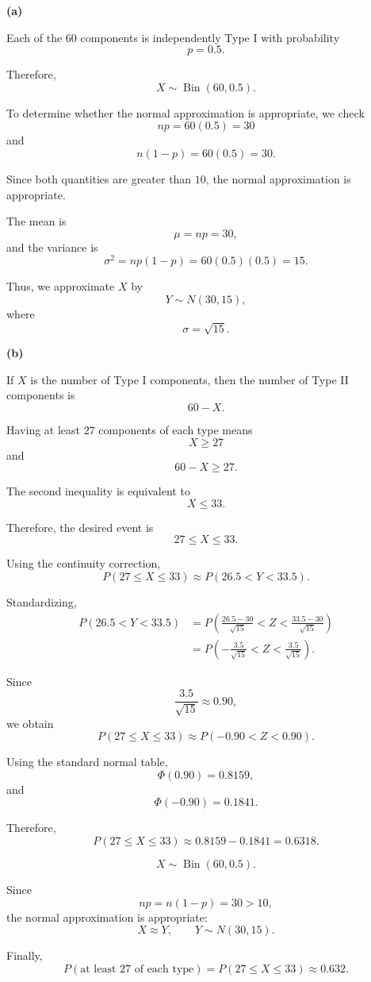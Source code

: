 \documentclass[11pt]{article}
\begin{document}
\begin{solutionbox}

\textbf{(a)}

Each of the \(60\) components is independently Type I with probability
\[
p=0.5.
\]

Therefore,
\[
X\sim\operatorname{Bin}(60,0.5).
\]

To determine whether the normal approximation is appropriate, we check
\[
np=60(0.5)=30
\]
and
\[
n(1-p)=60(0.5)=30.
\]

Since both quantities are greater than \(10\), the normal approximation is
appropriate.

The mean is
\[
\mu=np=30,
\]
and the variance is
\[
\sigma^2=np(1-p)
=
60(0.5)(0.5)
=
15.
\]

Thus, we approximate \(X\) by
\[
Y\sim N(30,15),
\]
where
\[
\sigma=\sqrt{15}.
\]


\textbf{(b)}

If \(X\) is the number of Type I components, then the number of Type II
components is
\[
60-X.
\]

Having at least \(27\) components of each type means
\[
X\geq27
\]
and
\[
60-X\geq27.
\]

The second inequality is equivalent to
\[
X\leq33.
\]

Therefore, the desired event is
\[
27\leq X\leq33.
\]

Using the continuity correction,
\[
P(27\leq X\leq33)
\approx
P(26.5<Y<33.5).
\]

Standardizing,
\begin{align*}
P(26.5<Y<33.5)
&=
P\left(
\frac{26.5-30}{\sqrt{15}}
<
Z
<
\frac{33.5-30}{\sqrt{15}}
\right)\\
&=
P\left(
-\frac{3.5}{\sqrt{15}}
<
Z
<
\frac{3.5}{\sqrt{15}}
\right).
\end{align*}

Since
\[
\frac{3.5}{\sqrt{15}}
\approx0.90,
\]
we obtain
\[
P(27\leq X\leq33)
\approx
P(-0.90<Z<0.90).
\]

Using the standard normal table,
\[
\Phi(0.90)=0.8159,
\]
and
\[
\Phi(-0.90)=0.1841.
\]

Therefore,
\[
P(27\leq X\leq33)
\approx
0.8159-0.1841
=
0.6318.
\]


\begin{finalanswerbox}

\[
X\sim\operatorname{Bin}(60,0.5).
\]

Since
\[
np=n(1-p)=30>10,
\]
the normal approximation is appropriate:
\[
X\approx Y,
\qquad
Y\sim N(30,15).
\]

Finally,
\[
P(\text{at least 27 of each type})
=
P(27\leq X\leq33)
\approx
0.632.
\]

\end{finalanswerbox}

\end{solutionbox}
\end{document}
